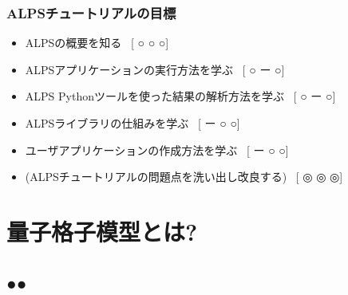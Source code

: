\begin{frame}
  \frametitle{ALPSチュートリアルの目標}
  \begin{itemize}
    \setlength{\itemsep}{1em}
    \item ALPSの概要を知る \ [{\footnotesize\color{red} ○}{\footnotesize\color{blue} ○}{\footnotesize\color{green} ○}]
    \item ALPSアプリケーションの実行方法を学ぶ  \ [{\footnotesize\color{red} ○}{\footnotesize\color{blue} ー}{\footnotesize\color{green} ○}]
    \item ALPS Pythonツールを使った結果の解析方法を学ぶ  \ [{\footnotesize\color{red} ○}{\footnotesize\color{blue} ー}{\footnotesize\color{green} ○}]
    \item ALPSライブラリの仕組みを学ぶ \ [{\footnotesize\color{red} ー}{\footnotesize\color{blue} ○}{\footnotesize\color{green} ○}]
    \item ユーザアプリケーションの作成方法を学ぶ  \ [{\footnotesize\color{red} ー}{\footnotesize\color{blue} ○}{\footnotesize\color{green} ○}]
    \item (ALPSチュートリアルの問題点を洗い出し改良する) \ [{\footnotesize\color{red} ◎}{\footnotesize\color{blue} ◎}{\footnotesize\color{green} ◎}] 
  \end{itemize}
\end{frame}

\section{量子格子模型とは?}
\subsection*{{\protect\color{red}●}{\protect\color{blue}●}}

